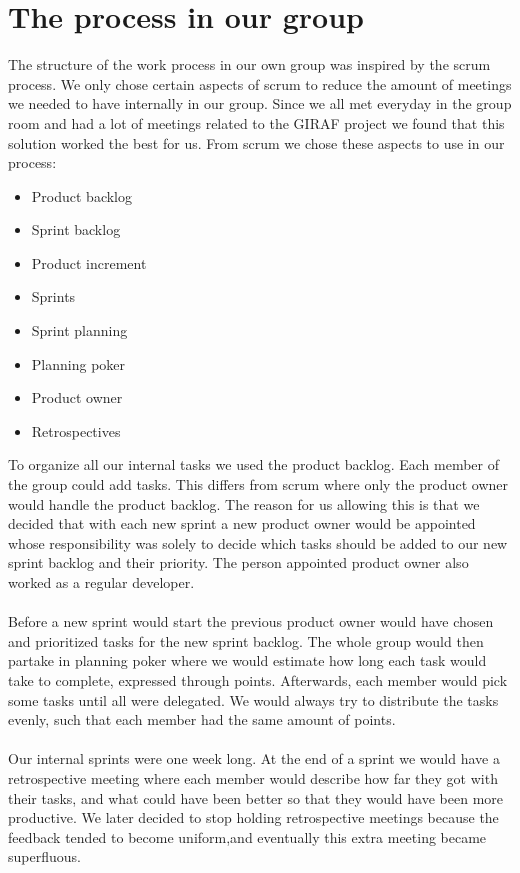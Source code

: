 \section{The process in our group}
The structure of the work process in our own group was inspired by the scrum process.
We only chose certain aspects of scrum to reduce the amount of meetings we needed to have internally in our group. 
Since we all met everyday in the group room and had a lot of meetings related to the GIRAF project we found that this solution worked the best for us.
From scrum we chose these aspects to use in our process:

 \begin{itemize}
    \item Product backlog
    \item Sprint backlog
    \item Product increment
    \item Sprints
    \item Sprint planning
    \item Planning poker
    \item Product owner
    \item Retrospectives
 \end{itemize}
To organize all our internal tasks we used the product backlog.
Each member of the group could add tasks.
This differs from scrum where only the product owner would handle the product backlog.
The reason for us allowing this is that we decided that with each new sprint a new product owner would be appointed whose responsibility was solely to decide which tasks should be added to our new sprint backlog and their priority.
The person appointed product owner also worked as a regular developer.
\\\\
Before a new sprint would start the previous product owner would have chosen and prioritized tasks for the new sprint backlog.
The whole group would then partake in planning poker where we would estimate how long each task would take to complete, expressed through points.
Afterwards, each member would pick some tasks until all were delegated.
We would always try to distribute the tasks evenly, such that each member had the same amount of points.
\\\\
Our internal sprints were one week long.
At the end of a sprint we would have a retrospective meeting where each member would describe how far they got with their tasks, and what could have been better so that they would have been more productive.
We later decided to stop holding retrospective meetings because the feedback tended to become uniform,and eventually this extra meeting became superfluous.


